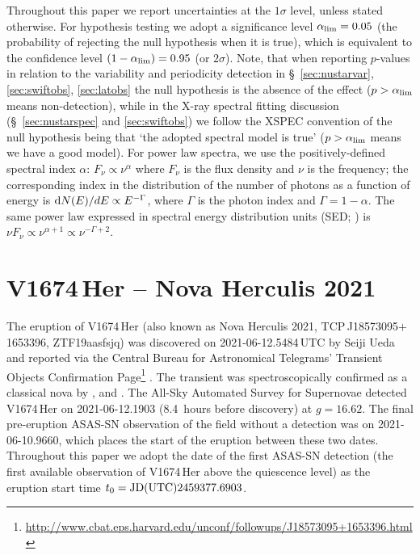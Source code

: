 \documentclass[a4paper,fleqn,usenatbib]{mnras}
\newcommand{\nova}{V1674\,Her}
\begin{document}
Throughout this paper we report uncertainties at the $1 \sigma$ level, unless stated otherwise.
%
For hypothesis testing we adopt a significance level $\alpha_{\rm lim} = 0.05$ 
(the probability of rejecting the null hypothesis when it is true),
which is equivalent to the confidence level $(1-\alpha_{\rm lim}) = 0.95$ (or $2 \sigma$).
Note, that when reporting $p$-values in relation to the variability and 
periodicity detection in \S~\ref{sec:nustarvar}, \ref{sec:swiftobs}, \ref{sec:latobs} 
the null hypothesis is the absence of the effect ($p>\alpha_{\rm lim}$ means non-detection), 
while in the X-ray spectral fitting discussion (\S~\ref{sec:nustarspec} and \ref{sec:swiftobs}) 
we follow the \textsc{XSPEC} \citep{1996ASPC..101...17A} convention of the null hypothesis
being that `the adopted spectral model is true' ($p>\alpha_{\rm lim}$ means we have a good model).
%
For power law spectra, we use the positively-defined spectral index $\alpha$: $F_\nu \propto \nu^\alpha$ 
where $F_\nu$ is the flux density and $\nu$ is the frequency; 
the corresponding index in the distribution of the number of photons 
as a function of energy  is ${\rm d}N(E)/dE \propto E^{-\Gamma}$, 
where $\Gamma$ is the photon index and $\Gamma = 1 - \alpha$.
The same power law expressed in spectral energy distribution units 
(SED; \citealt{1997NCimB.112...11G}) is $\nu F_\nu \propto \nu^{\alpha + 1} \propto \nu^{-\Gamma + 2}$.




\section{\nova{} -- Nova Herculis 2021}
\label{sec:thisnova}

The eruption of \nova{} (also known as Nova Herculis 2021, TCP\,J18573095$+$1653396, ZTF19aasfsjq) was discovered
on 2021-06-12.5484\,UTC by Seiji Ueda and reported via 
the Central Bureau for Astronomical Telegrams' Transient Objects Confirmation Page\footnote{\url{http://www.cbat.eps.harvard.edu/unconf/followups/J18573095+1653396.html}} 
\citep{2021CBET.4976....1U,2021CBET.4977....1K}. 
The transient was spectroscopically confirmed as a classical nova by 
\cite{2021ATel14704....1M}, \cite{2021ATel14710....1A} and \cite{2021CBET.4976....1U}. 
The All-Sky Automated Survey for Supernovae \citep[ASAS-SN][]{2014ApJ...788...48S,2017PASP..129j4502K} detected 
\nova{} on 2021-06-12.1903 (8.4~hours before discovery) at $g = 16.62$. The final pre-eruption ASAS-SN observation of the field without 
a detection was on 2021-06-10.9660, which places the start of the eruption between these two dates. 
Throughout this paper we adopt the date of the first ASAS-SN detection (the first available observation 
of \nova{} above the quiescence level) as the eruption start time $t_0 = {\rm JD(UTC)}2459377.6903$. 
\end{document}
